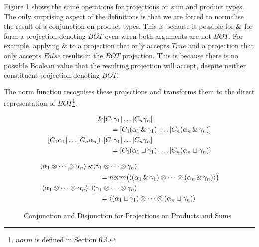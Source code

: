 Figure \ref{fig:conjDisSum} shows the same operations for projections on sum
and product types. The only surprising aspect of the definitions is that we are
forced to normalise the result of a conjunction on product types. This is
because it possible for $\operatorname{\&}$ for form a projection denoting $BOT$ even when
both arguments are not $BOT$. For example, applying $\&$ to a projection that
only accepts $True$ and a projection that only accepts $False$ results in the
$BOT$ projection. This is because there is no possible Boolean value that the
resulting projection will accept, despite neither constituent projection
denoting $BOT$.

The \<norm\> function recognises these projections and transforms them to the
direct representation of $BOT$\footnote{$norm$ is defined in
\cite{hinze1995projection} Section 6.3.}.

\begin{figure}
\noindent

\begin{align*}
[C_{1} \alpha_{1} | \dots | C_{n} \alpha_{n}] \pmeet& [C_{1} \gamma_{1} | \dots | C_{n} \gamma_{n}] \\
    & \quad = [C_{1} (\alpha_{1} \pmeet \gamma_{1}) | \dots | C_{n} (\alpha_{n} \pmeet \gamma_{n})] \\
[C_{1} \alpha_{1} | \dots | C_{n} \alpha_{n}] \sqcup& [C_{1} \gamma_{1} | \dots | C_{n} \gamma_{n}] \\
    & \quad = [C_{1} (\alpha_{1} \sqcup \gamma_{1}) | \dots | C_{n} (\alpha_{n} \sqcup \gamma_{n})]
\end{align*}%

\begin{align*}
\langle \alpha_{1} \otimes \dots \otimes \alpha_{n} \rangle \operatorname{\&}& \langle \gamma_{1} \otimes \dots \otimes \gamma_{n} \rangle \\
    & \quad = norm \big( \langle (\alpha_{1} \operatorname{\&} \gamma_{1}) \otimes \dots \otimes (\alpha_{n} \operatorname{\&} \gamma_{n})\rangle \big) \\
\langle \alpha_{1} \otimes \dots \otimes \alpha_{n} \rangle \sqcup& \langle \gamma_{1} \otimes \dots \otimes \gamma_{n} \rangle \\
    & \quad = \langle (\alpha_{1} \sqcup \gamma_{1}) \otimes \dots \otimes (\alpha_{n} \sqcup \gamma_{n})\rangle
\end{align*}
\caption[Conjunction and Disjunction for Projections 2]{Conjunction and Disjunction for Projections on Products and Sums}
\label{fig:conjDisSum}
\end{figure}

